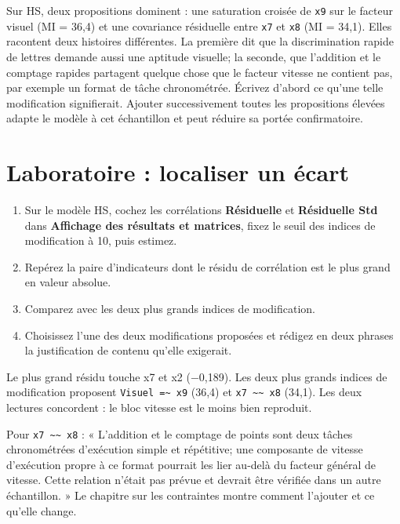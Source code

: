 \documentclass[
  french,
  11pt,
  a4paper,
  DIV=11,
  numbers=noendperiod]{scrreprt}
\providecommand{\tightlist}{%
  \setlength{\itemsep}{0pt}\setlength{\parskip}{0pt}}
\begin{document}
Sur HS, deux propositions dominent : une saturation croisée de
\texttt{x9} sur le facteur visuel (MI = 36,4) et une covariance
résiduelle entre \texttt{x7} et \texttt{x8} (MI = 34,1). Elles racontent
deux histoires différentes. La première dit que la discrimination rapide
de lettres demande aussi une aptitude visuelle; la seconde, que
l'addition et le comptage rapides partagent quelque chose que le facteur
vitesse ne contient pas, par exemple un format de tâche chronométrée.
Écrivez d'abord ce qu'une telle modification signifierait. Ajouter
successivement toutes les propositions élevées adapte le modèle à cet
échantillon et peut réduire sa portée confirmatoire.

\section{Laboratoire : localiser un
écart}\label{laboratoire-localiser-un-uxe9cart}

\begin{enumerate}
\def\labelenumi{\arabic{enumi}.}
\tightlist
\item
  Sur le modèle HS, cochez les corrélations \textbf{Résiduelle} et
  \textbf{Résiduelle Std} dans \textbf{Affichage des résultats et
  matrices}, fixez le seuil des indices de modification à 10, puis
  estimez.
\item
  Repérez la paire d'indicateurs dont le résidu de corrélation est le
  plus grand en valeur absolue.
\item
  Comparez avec les deux plus grands indices de modification.
\item
  Choisissez l'une des deux modifications proposées et rédigez en deux
  phrases la justification de contenu qu'elle exigerait.
\end{enumerate}

\begin{tcolorbox}[enhanced jigsaw, arc=.35mm, bottomrule=.15mm, bottomtitle=1mm, breakable, colback=white, colbacktitle=quarto-callout-tip-color!10!white, colframe=quarto-callout-tip-color-frame, coltitle=black, left=2mm, leftrule=.75mm, opacityback=0, opacitybacktitle=0.6, rightrule=.15mm, title={Réponse}, titlerule=0mm, toprule=.15mm, toptitle=1mm]

Le plus grand résidu touche x7 et x2 (−0,189). Les deux plus grands
indices de modification proposent
\texttt{Visuel\ =\textasciitilde{}\ x9} (36,4) et
\texttt{x7\ \textasciitilde{}\textasciitilde{}\ x8} (34,1). Les deux
lectures concordent : le bloc vitesse est le moins bien reproduit.

Pour \texttt{x7\ \textasciitilde{}\textasciitilde{}\ x8} : « L'addition
et le comptage de points sont deux tâches chronométrées d'exécution
simple et répétitive; une composante de vitesse d'exécution propre à ce
format pourrait les lier au-delà du facteur général de vitesse. Cette
relation n'était pas prévue et devrait être vérifiée dans un autre
échantillon. » Le chapitre sur les contraintes montre comment l'ajouter
et ce qu'elle change.

\end{tcolorbox}
\end{document}

